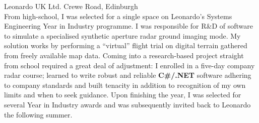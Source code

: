 \documentclass[]{cv-style}     %
\begin{document}
\begin{entrylist}
  {Leonardo UK Ltd.}
  {Crewe Road, Edinburgh}
  {\\
 From high-school, I was selected for a single space on Leonardo's Systems Engineering Year in Industry programme. I was responsible for R\&D of software to simulate a specialised synthetic aperture radar ground imaging mode. My solution works by performing a ``virtual'' flight trial on digital terrain gathered from freely available map data.
 Coming into a research-based project straight from school required a great deal of adjustment: I enrolled in a five-day company radar course; learned to write robust and reliable \textbf{C\#/.NET} software adhering to company standards and built tenacity in addition to recognition of my own limits and when to seek guidance.
 Upon finishing the year, I was selected for several Year in Industry awards and was subsequently invited back to Leonardo the following summer.
}


\end{entrylist}
\end{document}
